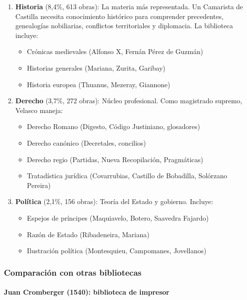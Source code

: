 \documentclass[12pt,a4paper]{article}
\begin{document}
\begin{enumerate}
\item \textbf{Historia} (8,4\%, 613 obras): La materia más representada. Un Camarista de Castilla necesita conocimiento histórico para comprender precedentes, genealogías nobiliarias, conflictos territoriales y diplomacia. La biblioteca incluye:
\begin{itemize}
\item Crónicas medievales (Alfonso X, Fernán Pérez de Guzmán)
\item Historias generales (Mariana, Zurita, Garibay)
\item Historia europea (Thuanus, Mezeray, Giannone)
\end{itemize}

\item \textbf{Derecho} (3,7\%, 272 obras): Núcleo profesional. Como magistrado supremo, Velasco maneja:
\begin{itemize}
\item Derecho Romano (Digesto, Código Justiniano, glosadores)
\item Derecho canónico (Decretales, concilios)
\item Derecho regio (Partidas, Nueva Recopilación, Pragmáticas)
\item Tratadística jurídica (Covarrubias, Castillo de Bobadilla, Solórzano Pereira)
\end{itemize}

\item \textbf{Política} (2,1\%, 156 obras): Teoría del Estado y gobierno. Incluye:
\begin{itemize}
\item Espejos de príncipes (Maquiavelo, Botero, Saavedra Fajardo)
\item Razón de Estado (Ribadeneira, Mariana)
\item Ilustración política (Montesquieu, Campomanes, Jovellanos)
\end{itemize}
\end{enumerate}

\subsubsection{Comparación con otras bibliotecas}

\paragraph{Juan Cromberger (1540): biblioteca de impresor}
\end{document}
